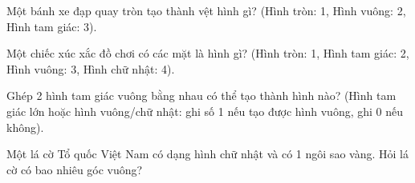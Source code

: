 \begin{ex} %
Một bánh xe đạp quay tròn tạo thành vệt hình gì? (Hình tròn: 1, Hình vuông: 2, Hình tam giác: 3).
\end{ex}

\begin{ex} %
Một chiếc xúc xắc đồ chơi có các mặt là hình gì? (Hình tròn: 1, Hình tam giác: 2, Hình vuông: 3, Hình chữ nhật: 4).
\end{ex}

\begin{ex} %
Ghép 2 hình tam giác vuông bằng nhau có thể tạo thành hình nào? (Hình tam giác lớn hoặc hình vuông/chữ nhật: ghi số 1 nếu tạo được hình vuông, ghi 0 nếu không).
\end{ex}

\begin{ex} %
Một lá cờ Tổ quốc Việt Nam có dạng hình chữ nhật và có 1 ngôi sao vàng. Hỏi lá cờ có bao nhiêu góc vuông?
\end{ex}
